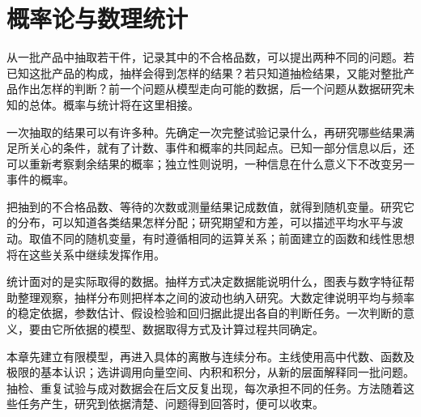 \chapter{概率论与数理统计}
\label{chap:probability}

从一批产品中抽取若干件，记录其中的不合格品数，可以提出两种不同的问题。若已知这批产品的构成，抽样会得到怎样的结果？若只知道抽检结果，又能对整批产品作出怎样的判断？前一个问题从模型走向可能的数据，后一个问题从数据研究未知的总体。概率与统计将在这里相接。

一次抽取的结果可以有许多种。先确定一次完整试验记录什么，再研究哪些结果满足所关心的条件，就有了计数、事件和概率的共同起点。已知一部分信息以后，还可以重新考察剩余结果的概率；独立性则说明，一种信息在什么意义下不改变另一事件的概率。

把抽到的不合格品数、等待的次数或测量结果记成数值，就得到随机变量。研究它的分布，可以知道各类结果怎样分配；研究期望和方差，可以描述平均水平与波动。取值不同的随机变量，有时遵循相同的运算关系；前面建立的函数和线性思想将在这些关系中继续发挥作用。

统计面对的是实际取得的数据。抽样方式决定数据能说明什么，图表与数字特征帮助整理观察，抽样分布则把样本之间的波动也纳入研究。大数定律说明平均与频率的稳定依据，参数估计、假设检验和回归据此提出各自的判断任务。一次判断的意义，要由它所依据的模型、数据取得方式及计算过程共同确定。

本章先建立有限模型，再进入具体的离散与连续分布。主线使用高中代数、函数及极限的基本认识；选讲调用向量空间、内积和积分，从新的层面解释同一批问题。抽检、重复试验与成对数据会在后文反复出现，每次承担不同的任务。方法随着这些任务产生，研究到依据清楚、问题得到回答时，便可以收束。


















